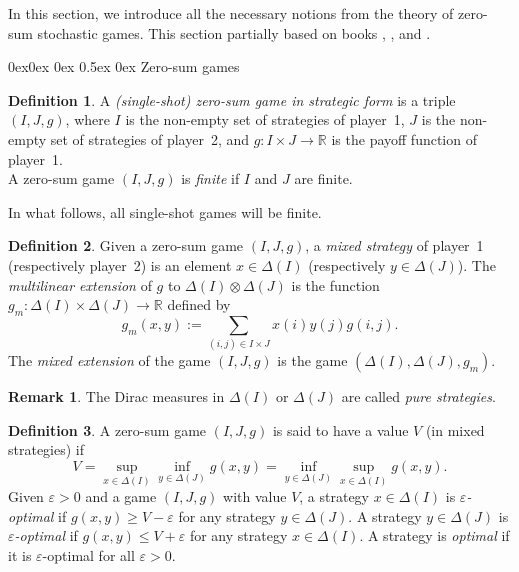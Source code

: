 \documentclass[english,openary,12pt]{article}
\makeatletter
\renewcommand\subsection{\@startsection{subsection}{2}{\z@}%
                                     {0ex\@plus 0ex \@minus 0ex}%
                                     {0.5ex \@plus 0ex}%
                                     {\normalfont\Large\bfseries}}%
\theoremstyle{definition}
\newtheorem{remark}{Remark}
\newtheorem{definition}{Definition}
\newcommand{\R}{\mathbb{R}}
\makeatother
\begin{document}

In this section, we introduce all the necessary notions from the theory of 
zero-sum stochastic games. This section partially based on books
\cite{MerSorZam15}, \cite{LarRenSor19}, and \cite{Sor02}.

\subsection{Zero-sum games}

\begin{definition}
A \emph{(single-shot) zero-sum game in strategic form} is a triple 
$(I, J, g)$, where $I$ is the non-empty set of strategies of player~1, 
$J$ is the non-empty set of strategies of player~2, and 
$g : I \times J \to \R$ is the payoff function of player~1. \\
A zero-sum game $(I, J, g)$ is \emph{finite} if $I$ and $J$ are finite.
\end{definition}

In what follows, all single-shot games will be finite.
 
\begin{definition}
Given a zero-sum game $(I, J, g)$, a \emph{mixed strategy} of player~1 
(respectively player~2) is an element $x \in \Delta(I)$ 
(respectively $y \in \Delta(J)$). 
The \emph{multilinear extension} of $g$ to $\Delta(I) \otimes \Delta(J)$ is 
the function
$g_m : \Delta(I) \times \Delta (J) \to \R$ defined by 
$$g_m(x, y) := \sum_{(i, j) \in I \times J} x (i) y (j) g (i, j).$$
The \textit{mixed extension} of the game $(I, J, g)$ is the game 
$(\Delta(I), \Delta(J), g_m).$
\end{definition}

\begin{remark}
The Dirac measures in $\Delta(I)$ or $\Delta(J)$ are called 
\emph{pure strategies}.
\end{remark}


\begin{definition}
A zero-sum game $(I, J, g)$ is said to have a value $V$ (in mixed strategies) if 
$$V = \sup\limits_{x\in \Delta(I)} \inf\limits_{y\in \Delta(J)} 
g(x, y) = \inf\limits_{y\in \Delta(J)} \sup\limits_{x\in \Delta(I)} g(x, y).$$
Given $\varepsilon > 0$ and a game $(I, J, g)$ with value $V$, 
a strategy $x \in \Delta(I)$ is \textit{$\varepsilon$-optimal} if 
$g(x,y) \ge V - \varepsilon$ for any strategy $y \in \Delta(J)$. 
A strategy $y \in \Delta(J)$ is \textit{$\varepsilon$-optimal} if 
$g(x,y) \le V + \varepsilon$ for any strategy $x \in \Delta(I)$. 
A strategy is \emph{optimal} if it is $\varepsilon$-optimal 
for all $\varepsilon > 0$.
\end{definition}
\end{document}
